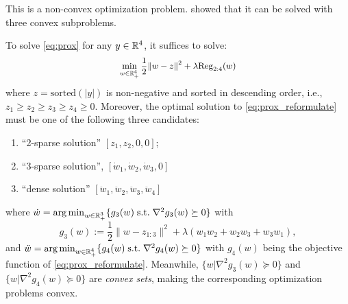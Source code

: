 This is a non-convex optimization problem. \citet{ann_paper} showed that it can be solved with three convex subproblems. 
\begin{theorem}\label{thm:split}
To solve \eqref{eq:prox} for any $y\in\mathbb{R}^4$, it suffices to solve: 
\begin{equation}\label{eq:prox_reformulate}
\small
\begin{aligned}
    \min_{w \in \mathbb{R}_+^4} \frac{1}{2} \|w - z\|^2 + \lambda \mathrm{Reg}_{2:4}(w)
\end{aligned}
\end{equation}
where $z = \mathrm{sorted}(|y|)$ is non-negative and sorted in descending order, i.e., $z_1\geq z_2\geq z_3 \geq z_4\geq 0$. Moreover, the optimal solution to \eqref{eq:prox_reformulate} must be one of the following three candidates:
\begin{enumerate}
    \item ``2-sparse solution'' $[z_1,z_2, 0,0]$; 
    \item ``3-sparse solution'', $[\dot{w}_1,\dot{w}_2,\dot{w}_3,0]$
    \item ``dense solution'' $[\ddot{w}_1,\ddot{w}_2,\ddot{w}_3,\ddot{w}_4]$
\end{enumerate}
where $\dot{w} = \operatorname*{arg\,min}_{w\in\mathbb{R}_+^3} \{g_3(w) \; \text{s.t.}\; \nabla^2 g_3(w) \succeq 0 \}$ with $$g_3(w) :=\frac{1}{2}\|w - z_{1:3}\|^2 + \lambda (w_1w_2 + w_2w_3 + w_3 w_1),$$
and $\ddot{w} = \operatorname*{arg\,min}_{w\in\mathbb{R}_+^4} \{g_4(w) \; \text{s.t.}\; \nabla^2 g_4(w) \succeq 0 \}$ with $g_4(w)$ being the objective function of \eqref{eq:prox_reformulate}. Meanwhile, $\{w | \nabla^2 g_3(w)\succeq 0 \}$ and  $\{ w | \nabla^2 g_4(w)\succeq 0 \}$ are \emph{convex sets}, making the corresponding optimization problems convex.

\end{theorem}

